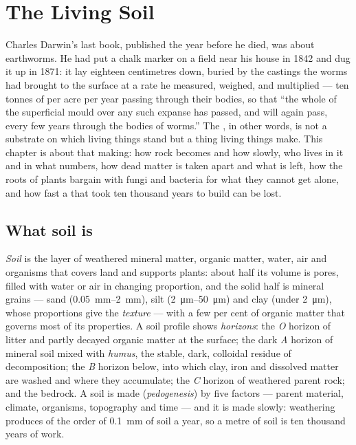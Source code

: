 \chapter{The Living Soil}\label{ch:b2:living-soil}

Charles Darwin's last book, published the year before he died, was
about earthworms. He had put a chalk marker on a field near his
house in 1842 and dug it up in 1871: it lay eighteen centimetres
down, buried by the castings the worms had brought to the surface
at a rate he measured, weighed, and multiplied --- ten tonnes of
 per acre per year passing through their bodies, so that
``the whole of the superficial mould over any such expanse has
passed, and will again pass, every few years through the bodies of
worms.'' The , in other words, is not a substrate on which
living things stand but a thing living things make. This chapter
is about that making: how rock becomes  and how slowly, who
lives in it and in what numbers, how dead matter is taken apart and
what is left, how the roots of plants bargain with fungi and
bacteria for what they cannot get alone, and how fast a  that
took ten thousand years to build can be lost.

\section{What soil is}

\begin{definition}\label{def:b2:living-soil:soil}
\emph{Soil} is the layer of weathered mineral matter, organic
matter, water, air and organisms that covers land and supports
plants: about half its volume is pores, filled with water or air
in changing proportion, and the solid half is mineral grains ---
sand (\qtyrange{0.05}{2}{mm}), silt (\qtyrange{2}{50}{\micro m}) and
clay (under \qty{2}{\micro m}), whose proportions give the
\emph{texture} --- with a few per cent of organic matter that
governs most of its properties. A soil profile shows
\emph{horizons}: the \emph{O} horizon of litter and partly decayed
organic matter at the surface; the dark \emph{A} horizon of mineral
soil mixed with \emph{humus}, the stable, dark, colloidal residue
of decomposition; the \emph{B} horizon below, into which clay,
iron and dissolved matter are washed and where they accumulate;
the \emph{C} horizon of weathered parent rock; and the bedrock. A
soil is made (\emph{pedogenesis}) by five factors --- parent
material, climate, organisms, topography and time --- and it is
made slowly: weathering produces of the order of \qty{0.1}{mm} of
soil a year, so a metre of soil is ten thousand years of work.
\end{definition}

